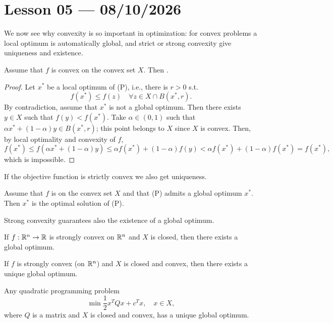 \section{Lesson 05 --- 08/10/2026}

We now see why convexity is so important in optimization: for convex problems a local optimum is automatically global, and strict or strong convexity give uniqueness and existence.

\begin{theorem}
    Assume that $f$ is convex on the convex set $X$. Then .
\end{theorem}
\begin{proof}
Let $x^*$ be a local optimum of (P), i.e., there is $r>0$ s.t.
\[
    f(x^*)\le f(z) \quad \forall z \in X \cap B(x^*,r).
\]
By contradiction, assume that $x^*$ is not a global optimum. Then there exists $y \in X$ such that $f(y) < f(x^*)$. Take $\alpha \in (0,1)$ such that $\alpha x^* + (1-\alpha)y \in B(x^*,r)$; this point belongs to $X$ since $X$ is convex. Then, by local optimality and convexity of $f$,
\[
    f(x^*) \le f(\alpha x^* + (1-\alpha)y) \le \alpha f(x^*) + (1-\alpha)f(y) < \alpha f(x^*) + (1-\alpha)f(x^*) = f(x^*),
\]
which is impossible.
\end{proof}

If the objective function is strictly convex we also get uniqueness.

\begin{proposition}
    Assume that $f$ is  on the convex set $X$ and that (P) admits a global optimum $x^*$. Then $x^*$ is the  optimal solution of (P).
\end{proposition}

Strong convexity guarantees also the existence of a global optimum.

\begin{theorem}
    If $f: \mathbb{R}^n \to \mathbb{R}$ is strongly convex on $\mathbb{R}^n$ and $X$ is closed, then there exists a global optimum.
\end{theorem}

\begin{corollary}
    If $f$ is strongly convex (on $\mathbb{R}^n$) and $X$ is closed and convex, then there exists a unique global optimum.
\end{corollary}

\begin{example}
    Any quadratic programming problem
    \[
        \min \frac{1}{2}x^TQx+c^Tx, \quad x\in X,
    \]
    where $Q$ is a  matrix and $X$ is closed and convex, has a unique global optimum.
\end{example}

